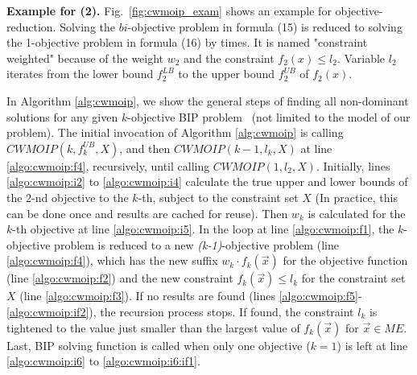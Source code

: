 \noindent\textbf{Example for (2).}  Fig.~\ref{fig:cwmoip_exam} shows an example for objective-reduction. Solving the $bi$-objective problem in formula (15)  is reduced to solving the 1-objective problem in formula (16) by  times. It is named "constraint weighted" because of the weight $w_2$ and the constraint $ f_2(x) \le l_2$. %
 Variable $l_2$ iterates from the lower bound $f^{LB}_2$ to the upper bound $f^{UB}_2$ of $ f_2(x)$. %



In Algorithm \ref{alg:cwmoip}, we show the general steps of finding all non-dominant solutions for any given $k$-objective BIP problem~\cite{DBLP:journals/eor/OzlenA09} (not limited to the model of our problem). The initial invocation of Algorithm \ref{alg:cwmoip} is calling $CWMOIP(k,f^{UB}_k,X)$, and then $CWMOIP(k-1,l_k,X)$ at line \ref{algo:cwmoip:f4}, recursively, until calling $CWMOIP(1,l_2,X)$. %
Initially, lines \ref{algo:cwmoip:i2} to \ref{algo:cwmoip:i4} calculate the true upper and lower bounds of the $2$-nd objective to the $k$-th, subject to the constraint set $X$ (In practice, this can be done once and results are cached for reuse). Then $w_k$ is calculated for the $k$-th objective at line \ref{algo:cwmoip:i5}. In the loop at line \ref{algo:cwmoip:f1}, the $k$-objective problem is reduced to a new \emph{(k-1)}-objective problem (line \ref{algo:cwmoip:f4}), which has the new suffix $w_k\cdot f_k(\vec x)$ for the objective function (line \ref{algo:cwmoip:f2}) and the new constraint $f_k(\vec x) \le l_k$ for the constraint set $X$ (line \ref{algo:cwmoip:f3}). If no results are found (lines \ref{algo:cwmoip:f5}-\ref{algo:cwmoip:if2}), the recursion process stops. If found, the constraint $l_k$ is tightened to the value just smaller than the largest value of  $f_k(\vec x)$ for $\vec x \in ME$. Last, BIP solving function is called when only one objective ($k=1$) is left at line \ref{algo:cwmoip:i6} to \ref{algo:cwmoip:i6:if1}.

